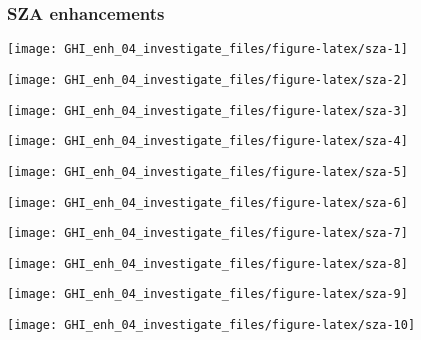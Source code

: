 \documentclass[
  10pt,
  a4paper,oneside]{article}
\begin{document}
\newpage
\FloatBarrier

\hypertarget{sza-enhancements}{%
\subsubsection{SZA enhancements}\label{sza-enhancements}}

\begin{center}\texttt{[image: GHI\_enh\_04\_investigate\_files/figure-latex/sza-1]} \end{center}

\begin{center}\texttt{[image: GHI\_enh\_04\_investigate\_files/figure-latex/sza-2]} \end{center}

\begin{center}\texttt{[image: GHI\_enh\_04\_investigate\_files/figure-latex/sza-3]} \end{center}

\begin{center}\texttt{[image: GHI\_enh\_04\_investigate\_files/figure-latex/sza-4]} \end{center}

\begin{center}\texttt{[image: GHI\_enh\_04\_investigate\_files/figure-latex/sza-5]} \end{center}

\begin{center}\texttt{[image: GHI\_enh\_04\_investigate\_files/figure-latex/sza-6]} \end{center}

\begin{center}\texttt{[image: GHI\_enh\_04\_investigate\_files/figure-latex/sza-7]} \end{center}

\begin{center}\texttt{[image: GHI\_enh\_04\_investigate\_files/figure-latex/sza-8]} \end{center}

\begin{center}\texttt{[image: GHI\_enh\_04\_investigate\_files/figure-latex/sza-9]} \end{center}

\begin{center}\texttt{[image: GHI\_enh\_04\_investigate\_files/figure-latex/sza-10]} \end{center}
\end{document}
